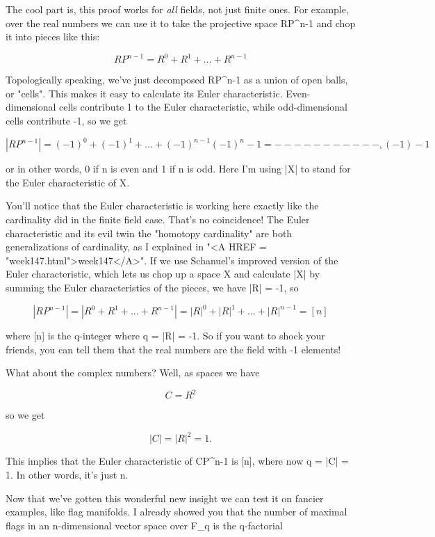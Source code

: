 The cool part is, this proof works for \emph{all} fields, not just finite
ones.  For example, over the real numbers we can use it to take the
projective space RP^{n-1} and chop it into pieces like this:

$$
    RP^{n-1} = R^{0} + R^{1} + ... + R^{n-1} 
$$
    

Topologically speaking, we've just decomposed RP^{n-1} as a
union of open balls, or "cells".  This makes it easy to
calculate its Euler characteristic.  Even-dimensional cells contribute 1
to the Euler characteristic, while odd-dimensional cells contribute -1,
so we get

$$
   |RP^{n-1}| = (-1)^{0} + (-1)^{1} + ... + (-1)^{n-1} 

            (-1)^{n} - 1
          = ----------- ,
             (-1) - 1              
$$
    
or in other words, 0 if n is even and 1 if n is odd.  Here I'm using |X|
to stand for the Euler characteristic of X.

You'll notice that the Euler characteristic is working here exactly like
the cardinality did in the finite field case.  That's no coincidence!
The Euler characteristic and its evil twin the "homotopy
cardinality" are both generalizations of cardinality, as I
explained in "<A HREF = "week147.html">week147</A>".  If we
use Schanuel's improved version of the Euler characteristic, which lets
us chop up a space X and calculate |X| by summing the Euler
characteristics of the pieces, we have |R| = -1, so

$$
       |RP^{n-1}| = |R^{0} + R^{1} + ... + R^{n-1}|

              = |R|^{0} + |R|^{1} + ... + |R|^{n-1}

              = [n]
$$
    
where [n] is the q-integer where q = |R| = -1.  So if you want to shock
your friends, you can tell them that the real numbers are the field with
-1 elements!

What about the complex numbers?  Well, as spaces we have 

$$
C = R^{2}
$$
    
so we get

$$
|C| = |R|^{2} = 1.
$$
    
This implies that the Euler characteristic of CP^{n-1} is [n], where
now q = |C| = 1.  In other words, it's just n.  

Now that we've gotten this wonderful new insight we can test it on
fancier examples, like flag manifolds.  I already showed you that the
number of maximal flags in an n-dimensional vector space over F_{q} is 
the q-factorial 

